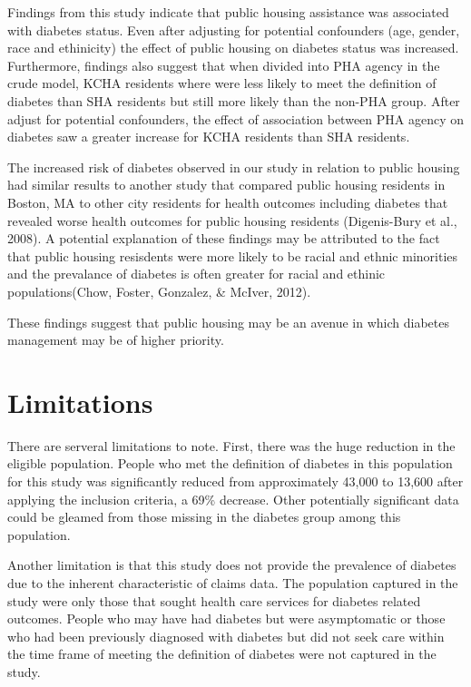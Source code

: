 \documentclass [11pt, proquest] {uwthesis}[2015/03/03]
\begin{document}
Findings from this study indicate that public housing assistance was
associated with diabetes status. Even after adjusting for potential
confounders (age, gender, race and ethinicity) the effect of public
housing on diabetes status was increased. Furthermore, findings also
suggest that when divided into PHA agency in the crude model, KCHA
residents where were less likely to meet the definition of diabetes than
SHA residents but still more likely than the non-PHA group. After adjust
for potential confounders, the effect of association between PHA agency
on diabetes saw a greater increase for KCHA residents than SHA
residents.

The increased risk of diabetes observed in our study in relation to
public housing had similar results to another study that compared public
housing residents in Boston, MA to other city residents for health
outcomes including diabetes that revealed worse health outcomes for
public housing residents (Digenis-Bury et al., 2008). A potential
explanation of these findings may be attributed to the fact that public
housing resisdents were more likely to be racial and ethnic minorities
and the prevalance of diabetes is often greater for racial and ethinic
populations(Chow, Foster, Gonzalez, \& McIver, 2012).

These findings suggest that public housing may be an avenue in which
diabetes management may be of higher priority.

\section{Limitations}\label{limitations}

There are serveral limitations to note. First, there was the huge
reduction in the eligible population. People who met the definition of
diabetes in this population for this study was significantly reduced
from approximately 43,000 to 13,600 after applying the inclusion
criteria, a 69\% decrease. Other potentially significant data could be
gleamed from those missing in the diabetes group among this population.

Another limitation is that this study does not provide the prevalence of
diabetes due to the inherent characteristic of claims data. The
population captured in the study were only those that sought health care
services for diabetes related outcomes. People who may have had diabetes
but were asymptomatic or those who had been previously diagnosed with
diabetes but did not seek care within the time frame of meeting the
definition of diabetes were not captured in the study.
\end{document}
